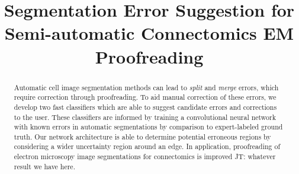 \documentclass{llncs}
\newcommand{\tnote}[3]{{\color{#2}#1: #3}}
\newcommand{\JT}[1]{\tnote{JT}{blue}{#1}}
\begin{document}
%
\title{Segmentation Error Suggestion for Semi-automatic Connectomics EM Proofreading}
%
%
%
%
%

\maketitle              %

\begin{abstract}
Automatic cell image segmentation methods can lead to \emph{split} and \emph{merge} errors, which require correction through proofreading. To aid manual correction of these errors, we develop two fast classifiers which are able to suggest candidate errors and corrections to the user. These classifiers are informed by training a convolutional neural network with known errors in automatic segmentations by comparison to expert-labeled ground truth. Our network architecture is able to determine potential erroneous regions by considering a wider uncertainty region around an edge. In application, proofreading of electron microscopy image segmentations for connectomics is improved \JT{whatever result we have here}.
\end{abstract}
%

%





%
%


\end{document}
